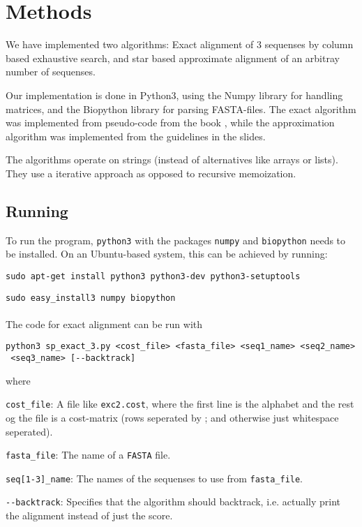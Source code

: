 \section{Methods}

We have implemented two algorithms: Exact alignment of 3 sequenses by
column based exhaustive search, and star based approximate alignment
of an arbitray number of sequenses.

Our implementation is done in Python3, using the Numpy library for
handling matrices, and the Biopython library for parsing FASTA-files.
The exact algorithm was implemented from pseudo-code from the book
\citep{Gusfield}, while the approximation algorithm was implemented
from the guidelines in the slides.

The algorithms operate on strings (instead of alternatives like arrays
or lists). They use a iterative approach as opposed to recursive
memoization.

\subsection{Running}

To run the program, \verb|python3| with the packages \verb|numpy| and
\verb|biopython| needs to be installed. On an Ubuntu-based system, this can
be achieved by running:

\verb|sudo apt-get install python3 python3-dev python3-setuptools|

\verb|sudo easy_install3 numpy biopython|

\paragraph{}
The code for exact alignment can be run with

\begin{verbatim}
python3 sp_exact_3.py <cost_file> <fasta_file> <seq1_name> <seq2_name>
 <seq3_name> [--backtrack]
\end{verbatim}

where

\begin{description}
\item{\verb|cost_file|:} A file like \verb|exc2.cost|, where the
  first line is the alphabet and the rest og the file is a cost-matrix
  (rows seperated by ; and otherwise just whitespace seperated).
\item{\verb|fasta_file|:} The name of a \verb|FASTA| file.
\item{\verb|seq[1-3]_name|:} The names of the sequenses to use from
  \verb|fasta_file|.
\item{\verb|--backtrack|:} Specifies that the algorithm should
  backtrack, i.e. actually print the alignment instead of just the
  score.
\end{description}

